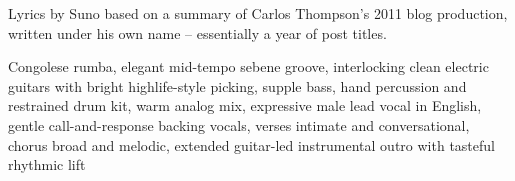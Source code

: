
\begin{notes}
Lyrics by Suno based on a summary of Carlos Thompson's 2011 blog production, written under his own name -- essentially a year of post titles.
\end{notes}
\begin{style}
Congolese rumba, elegant mid-tempo sebene groove, interlocking clean electric guitars with bright highlife-style picking, supple bass, hand percussion and restrained drum kit, warm analog mix, expressive male lead vocal in English, gentle call-and-response backing vocals, verses intimate and conversational, chorus broad and melodic, extended guitar-led instrumental outro with tasteful rhythmic lift
\end{style}
